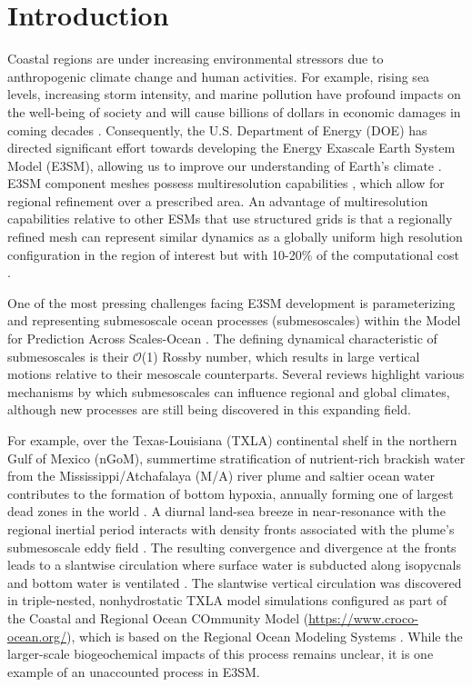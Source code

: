 \section{Introduction}
Coastal regions are under increasing environmental stressors due to anthropogenic climate change and human activities. For example, rising sea levels, increasing storm intensity, and marine pollution have profound impacts on the well-being of society and will cause billions of dollars in economic damages in coming decades \citep{RN23}. Consequently, the U.S. Department of Energy (DOE) has directed significant effort towards developing the Energy Exascale Earth System Model (E3SM), allowing us to improve our understanding of Earth's climate \citep{golaz2022doe}. E3SM component meshes possess multiresolution capabilities \citep{ringler2008multiresolution}, which allow for regional refinement over a prescribed area. An advantage of multiresolution capabilities relative to other ESMs that use structured grids \citep[e.g., the Community Earth System Model, ][]{danabasoglu2020community} is that a regionally refined mesh can represent similar dynamics as a globally uniform high resolution configuration in the region of interest but with 10-20\% of the computational cost \citep{tang2023fully}. 

One of the most pressing challenges facing E3SM development is parameterizing and representing submesoscale ocean processes (submesoscales) within the Model for Prediction Across Scales-Ocean \citep[MPAS-O,][]{ringler2013multi}. The defining dynamical characteristic of submesoscales is their $\mathcal{O}$(1) Rossby number, which results in large vertical motions relative to their mesoscale counterparts. Several reviews \citep{McWilliams_2016,mcwilliams2019survey,taylor2023submesoscale} highlight various mechanisms by which submesoscales can influence regional and global climates, although new processes are still being discovered in this expanding field. 

For example, over the Texas-Louisiana (TXLA) continental shelf in the northern Gulf of Mexico (nGoM), summertime stratification of nutrient-rich brackish water from the Mississippi/Atchafalaya (M/A) river plume and saltier ocean water contributes to the formation of bottom hypoxia, annually forming one of largest dead zones in the world \citep{bianchi2010science, ruiz2021small}. A diurnal land-sea breeze in near-resonance with the regional inertial period interacts with density fronts associated with the plume’s submesoscale eddy field \citep{Hetland_2017, Kobashi_2020}. The resulting convergence and divergence at the fronts leads to a slantwise circulation where surface water is subducted along isopycnals and bottom water is ventilated \citep{qu2022rapid}. The slantwise vertical circulation was discovered in triple-nested, nonhydrostatic TXLA model simulations configured as part of the Coastal and Regional Ocean COmmunity Model (\url{https://www.croco-ocean.org/}), which is based on the Regional Ocean Modeling Systems \citep[ROMS, ]{shchepetkin2005regional}. While the larger-scale biogeochemical impacts of this process remains unclear, it is one example of an unaccounted process in E3SM. 

